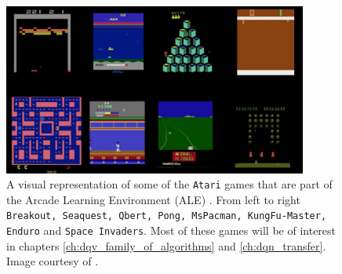 \begin{figure}[ht!]
\centering
  \includegraphics[width=10cm]{./Images/Chapter02/atari_games}
  \caption{A visual representation of some of the \texttt{Atari} games that are part of the Arcade Learning Environment (ALE) \cite{bellemare2013arcade}. From left to right \texttt{Breakout, Seaquest, Qbert, Pong, MsPacman, KungFu-Master, Enduro} and \texttt{Space Invaders}. Most of these games will be of interest in chapters \ref{ch:dqv_family_of_algorithms} and \ref{ch:dqn_transfer}. Image courtesy of .}
  \label{fig:atari_games}
\end{figure}



